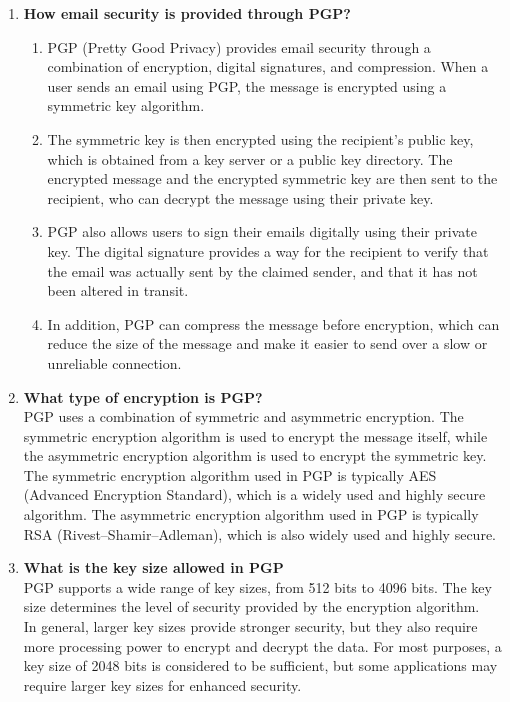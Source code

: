 \documentclass[openany]{book}
\begin{document}
\begin{enumerate}
    \item \textbf{How email security is provided through PGP?}\\

          \begin{enumerate}
              \item PGP (Pretty Good Privacy) provides email security through a combination of encryption, digital signatures, and compression. When a user sends an email using PGP, the message is encrypted using a symmetric key algorithm.

              \item The symmetric key is then encrypted using the recipient's public key, which is obtained from a key server or a public key directory. The encrypted message and the encrypted symmetric key are then sent to the recipient, who can decrypt the message using their private key.

              \item PGP also allows users to sign their emails digitally using their private key. The digital signature provides a way for the recipient to verify that the email was actually sent by the claimed sender, and that it has not been altered in transit.
              \item In addition, PGP can compress the message before encryption, which can reduce the size of the message and make it easier to send over a slow or unreliable connection.
          \end{enumerate}

    \item \textbf{What type of encryption is PGP?}\\

          PGP uses a combination of symmetric and asymmetric encryption. The symmetric encryption algorithm is used to encrypt the message itself, while the asymmetric encryption algorithm is used to encrypt the symmetric key.\\

          The symmetric encryption algorithm used in PGP is typically AES (Advanced Encryption Standard), which is a widely used and highly secure algorithm. The asymmetric encryption algorithm used in PGP is typically RSA (Rivest–Shamir–Adleman), which is also widely used and highly secure.

    \item \textbf{What is the key size allowed in PGP}\\

          PGP supports a wide range of key sizes, from 512 bits to 4096 bits. The key size determines the level of security provided by the encryption algorithm.\\

          In general, larger key sizes provide stronger security, but they also require more processing power to encrypt and decrypt the data. For most purposes, a key size of 2048 bits is considered to be sufficient, but some applications may require larger key sizes for enhanced security.


\end{enumerate}
\end{document}

